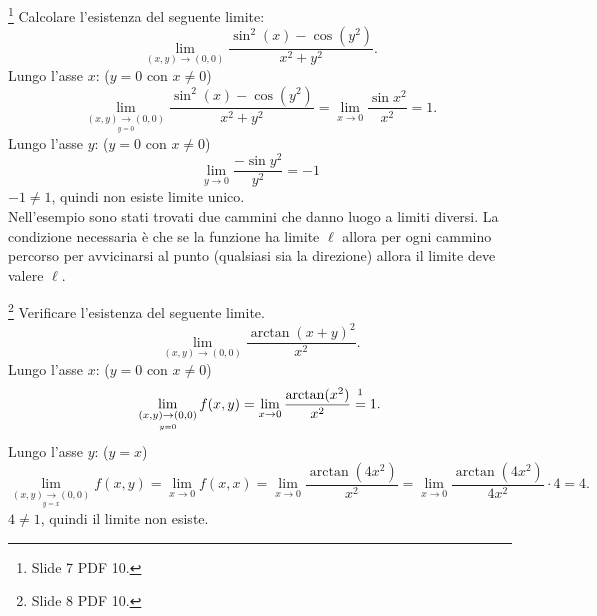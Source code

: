 \begin{example}\footnote{Slide 7 PDF 10.}
    Calcolare l'esistenza del seguente limite:
    \begin{equation*}
        \lim_{(x,y)\rightarrow(0,0)}\frac{\sin^2(x)-\cos(y^2)}{x^2+y^2}.
    \end{equation*}
    Lungo l'asse $x$: ($y=0$ con $x\neq 0$)
    \begin{equation*}
        \lim_{\underset{y=0}{(x,y)\rightarrow(0,0)}}\frac{\sin^2(x)-\cos(y^2)}{x^2+y^2}=\lim_{x\rightarrow 0}\frac{\sin x^2}{x^2}=1.
    \end{equation*}
    Lungo l'asse $y$: ($y=0$ con $x\neq 0$)
    \begin{equation*}
        \lim_{y\rightarrow 0}\frac{-\sin y^2}{y^2}=-1
    \end{equation*}
    $-1\neq 1$, quindi non esiste limite unico.\\
    Nell'esempio sono stati trovati due cammini che danno luogo a limiti diversi. La condizione necessaria è che se la funzione ha limite $\ell$ allora per ogni cammino percorso per avvicinarsi al punto (qualsiasi sia la direzione) allora il limite deve valere $\ell$.
\end{example}

\begin{example}\footnote{Slide 8 PDF 10.}
    Verificare l'esistenza del seguente limite.
    \begin{equation*}
        \lim_{(x,y)\rightarrow(0,0)}\frac{\arctan(x+y)^2}{x^2}.
    \end{equation*}
    Lungo l'asse $x$: ($y=0$ con $x\neq 0$)
    \begin{equation*}
        \lim_{\underset{y=0}{(x,y)\rightarrow(0,0)}}f(x, y)= \lim_{x\rightarrow 0}\frac{\arctan(x^2)}{x^2}\overset{\footnotemark}{=}1.
    \end{equation*}
    Lungo l'asse $y$: ($y=x$)
    \begin{equation*}
        \lim_{\underset{y=x}{(x,y)\rightarrow (0,0)}}f(x,y)=\lim_{x\rightarrow 0}f(x,x)=\lim_{x\rightarrow 0}\frac{\arctan(4x^2)}{x^2}=\lim_{x\rightarrow 0}\frac{\arctan(4x^2)}{4x^2}\cdot 4=4.
    \end{equation*}
    $4\neq 1$, quindi il limite non esiste.
\end{example}

